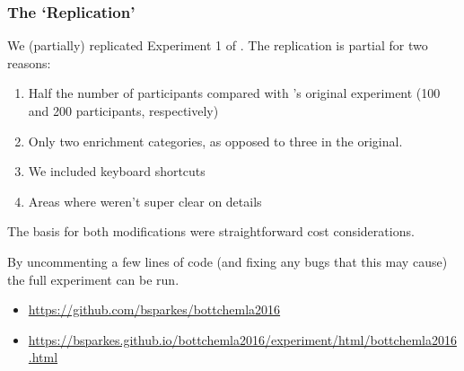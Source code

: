 \documentclass[noamssymb]{beamer}
\begin{document}
\begin{frame}
\end{frame}



\begin{frame}
  \frametitle{{\ftf The `Replication'}}
  We (partially) replicated Experiment 1 of \citeauthor{Bott:2016aa}.
The replication is partial for two reasons:
\begin{enumerate}[label=\arabic*)]
\item Half the number of participants compared with \citeauthor{Bott:2016aa}'s original experiment (100 and 200 participants, respectively)
\item Only two enrichment categories, as opposed to three in the original.
\item We included keyboard shortcuts
\item Areas where \citeauthor{Bott:2016aa} weren't super clear on details
\end{enumerate}
The basis for both modifications were straightforward cost considerations.

By uncommenting a few lines of code (and fixing any bugs that this may cause) the full experiment can be run.

{\footnotesize
\begin{itemize}
\item \url{https://github.com/bsparkes/bottchemla2016}
\item \url{https://bsparkes.github.io/bottchemla2016/experiment/html/bottchemla2016.html}
\end{itemize}
}

\end{frame}
\end{document}
